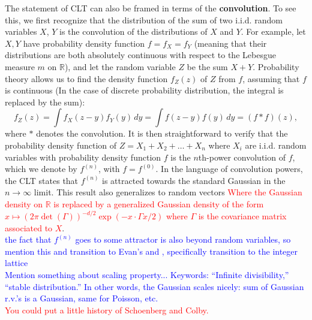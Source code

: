 \documentclass[11pt, letter]{book}
\renewcommand\det{\operatorname{det}}
\begin{document}
\noindent The statement of CLT can also be framed in terms of the \textbf{convolution}. To see this, we first recognize that the distribution of the sum of two i.i.d. random variables $X$, $Y$ is the convolution of the distributions of $X$ and $Y$. For example, let $X,Y$ have probability density function $f = f_X = f_Y$ (meaning that their distributions are both absolutely continuous with respect to the Lebesgue measure $m$ on $\mathbb{R}$), and let the random variable $Z$ be the sum $X + Y$. Probability theory allows us to find the density function $f_Z(z)$ of $Z$ from $f$, assuming that $f$ is continuous (In the case of discrete probability distribution, the integral is replaced by the sum):
\begin{equation*}
    f_Z(z) = \int  f_X(z-y) f_Y(y)\,dy = \int  f(z-y) f(y)\,dy = (f * f)(z),
\end{equation*}
where $*$ denotes the convolution. It is then straightforward to verify that the probability density function of $Z = X_1 + X_2 + \dots + X_n$ where $X_i$ are i.i.d. random variables with probability density function $f$ is the $n$th-power convolution of $f$, which we denote by $f^{(n)}$, with $f = f^{(0)}$. In the language of convolution powers, the CLT states that $f^{(n)}$ is attracted towards the standard Gaussian in the $n\to \infty$ limit. This result also generalizes to random vectors \textcolor{red}{Where the Gaussian density on $\mathbb{R}$ is replaced by a generalized Gaussian density of the form $x\mapsto (2\pi \det(\Gamma))^{-d/2}\exp(-x\cdot \Gamma x/2)$ where $\Gamma$ is the covariance matrix associated to $X$}.\\

\textcolor{blue}{the fact that $f^{(n)}$ goes to some attractor is also beyond random variables, so mention this and transition to Evan's \cite{randles_convolution_2015} and \cite{randles_convolution_2017}, specifically transition to the integer lattice}\\


\textcolor{blue}{Mention something about scaling property... Keywords: ``Infinite divisibility,'' ``stable distribution.'' In other words, the Gaussian scales nicely: sum of Gaussian r.v.'s is a Gaussian, same for Poisson, etc. }\\


\textcolor{red}{You could put a little history of Schoenberg and Colby.}
\end{document}
